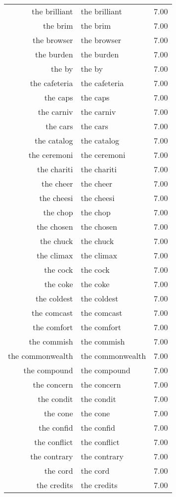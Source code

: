 \begin{table}[ht]
\begin{tabular}{rlr}
  the brilliant & the brilliant & 7.00 \\ 
  the brim & the brim & 7.00 \\ 
  the browser & the browser & 7.00 \\ 
  the burden & the burden & 7.00 \\ 
  the by & the by & 7.00 \\ 
  the cafeteria & the cafeteria & 7.00 \\ 
  the caps & the caps & 7.00 \\ 
  the carniv & the carniv & 7.00 \\ 
  the cars & the cars & 7.00 \\ 
  the catalog & the catalog & 7.00 \\ 
  the ceremoni & the ceremoni & 7.00 \\ 
  the chariti & the chariti & 7.00 \\ 
  the cheer & the cheer & 7.00 \\ 
  the cheesi & the cheesi & 7.00 \\ 
  the chop & the chop & 7.00 \\ 
  the chosen & the chosen & 7.00 \\ 
  the chuck & the chuck & 7.00 \\ 
  the climax & the climax & 7.00 \\ 
  the cock & the cock & 7.00 \\ 
  the coke & the coke & 7.00 \\ 
  the coldest & the coldest & 7.00 \\ 
  the comcast & the comcast & 7.00 \\ 
  the comfort & the comfort & 7.00 \\ 
  the commish & the commish & 7.00 \\ 
  the commonwealth & the commonwealth & 7.00 \\ 
  the compound & the compound & 7.00 \\ 
  the concern & the concern & 7.00 \\ 
  the condit & the condit & 7.00 \\ 
  the cone & the cone & 7.00 \\ 
  the confid & the confid & 7.00 \\ 
  the conflict & the conflict & 7.00 \\ 
  the contrary & the contrary & 7.00 \\ 
  the cord & the cord & 7.00 \\ 
  the credits & the credits & 7.00 \\ 

\end{tabular}
\end{table}
